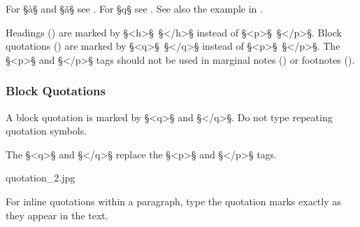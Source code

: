 \begin{crossref}
For  §à§ and §ã§ see . For  §\´q§ see . See also the example in .
\end{crossref}

\begin{note}
Headings () are marked by §<h>§~§</h>§ instead of §<p>§~§</p>§. Block quotations  () are marked by §<q>§~§</q>§ instead of §<p>§~§</p>§. The §<p>§ and §</p>§ tags should not be used in marginal notes () or footnotes (). 
\end{note}


\subsubsection{Block Quotations}
\label{section block quotations}

\begin{mainrule}
A block quotation is marked by §<q>§ and §</q>§. Do not type repeating quotation symbols.
\end{mainrule}

\begin{clarification}
The §<q>§ and §</q>§ replace the §<p>§ and §</p>§ tags.
\end{clarification}

\begin{sampleImage}{quotation_2.jpg} 
\end{sampleImage}

\begin{note}
For inline quotations within a paragraph, type the quotation marks exactly as they appear in the text.
\end{note}


